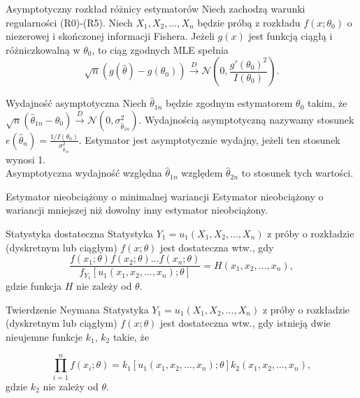 \documentclass[avery5371, grid, frame]{flashcards}
\begin{document}
\begin{flashcard}[Twierdzenie]{Asymptotyczny rozkład różnicy estymatorów}
    Niech zachodzą warunki regularności (R0)-(R5). Niech $X_1, X_2, \dots, X_n$ będzie próbą z rozkładu $f(x; \theta_0)$ o niezerowej i skończonej informacji Fishera. Jeżeli $g(x)$ jest funkcją ciągłą i różniczkowalną w $\theta_0$, to ciąg zgodnych MLE spełnia
    $$\sqrt{n} (g(\hat{\theta}) - g(\theta_0)) \overset{D}{\rightarrow} \mathcal{N} \left( 0, \frac{g'(\theta_0)^2}{I(\theta_0)} \right). $$
\end{flashcard}

\begin{flashcard}[Definicja]{Wydajność asymptotyczna}
    Niech $\hat{\theta}_{1n}$ będzie zgodnym estymatorem $\theta_0$ takim, że $\sqrt{n}(\hat{\theta}_{1n} - \theta_0) \xrightarrow{D} \mathcal{N}(0, \sigma_{\hat{\theta}_{1n}}^2).$ Wydajnością asymptotyczną nazywamy stosunek $e(\hat{\theta}_{n}) = \frac{1/I(\theta_0)}{\sigma_{\hat{\theta}_{1n}}^2}$. Estymator jest asymptotycznie wydajny, jeżeli ten stosunek wynosi 1. \\
    Asymptotyczna wydajność względna $\hat{\theta}_{1n}$ względem $\hat{\theta}_{2n}$ to stosunek tych wartości.

\end{flashcard}

\begin{flashcard}[Definicja]{Estymator nieobciążony o minimalnej wariancji}
    Estymator nieobciążony o wariancji mniejszej niż dowolny inny estymator nieobciążony.
\end{flashcard}

\begin{flashcard}[Definicja]{Statystyka dostateczna}
    Statystyka $Y_1 = u_1(X_1, X_2, \dots, X_n)$ z próby o rozkładzie (dyskretnym lub ciągłym) $f(x; \theta)$ jest dostateczna wtw., gdy
    $$ \frac{f(x_1; \theta) f(x_2; \theta) \dots f(x_n; \theta)}{f_{Y_1}[u_1(x_1, x_2, \dots, x_n); \theta]} = H(x_1, x_2, \dots, x_n),$$ gdzie funkcja $H$ nie zależy od $\theta$.
\end{flashcard}

\begin{flashcard}[Twierdzenie]{Twierdzenie Neymana}
    Statystyka $Y_1 = u_1(X_1, X_2, \dots, X_n)$ z próby o rozkładzie (dyskretnym lub ciągłym) $f(x; \theta)$ jest dostateczna wtw., gdy istnieją dwie nieujemne funkcje $k_1$, $k_2$ takie, że
    \begin{small}
    $$ \prod_{i=1}^n f(x_i; \theta) = k_1[u_1(x_1, x_2, \dots, x_n); \theta] k_2(x_1, x_2, \dots, x_n), $$ gdzie $k_2$ nie zależy od $\theta$.
    \end{small}
\end{flashcard}
\end{document}
